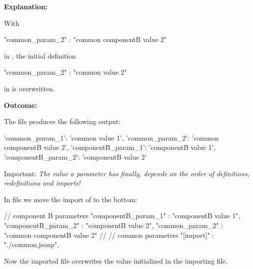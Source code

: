 
\newpage

\textbf{Explanation:}

\vspace{2ex}

With

\begin{pythoncode}
   "common_param_2" : "common componentB value 2"
\end{pythoncode}

in , the initial definition

\begin{pythoncode}
   "common_param_2" : "common value 2"
\end{pythoncode}

in  is overwritten.

\vspace{2ex}

\textbf{Outcome:}

\vspace{2ex}

The file  produces the following output:

\begin{pythonlog}
{'common_param_1': 'common value 1',
 'common_param_2': 'common componentB value 2',
 'componentB_param_1': 'componentB value 1',
 'componentB_param_2': 'componentB value 2'}
\end{pythonlog}

\vspace{2ex}

Important: \textit{The value a parameter has finally, depends on the order of definitions, redefinitions and imports!}

\vspace{2ex}

In file  we move the import of  to the bottom:

\begin{pythoncode}[linebackgroundcolor=\hlcode{8}]
{
   // component B parameters
   "componentB_param_1" : "componentB value 1",
   "componentB_param_2" : "componentB value 2",
   "common_param_2" : "common componentB value 2"
   //
   // common parameters
   "[import]" : "./common.jsonp",
}
\end{pythoncode}

Now the imported file overwrites the value initialized in the importing file.

